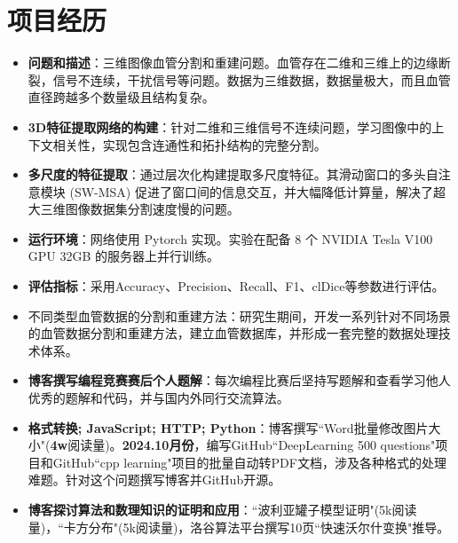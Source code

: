 \documentclass{resume}
\begin{document}

\section{项目经历}

\begin{itemize}	
	\item \textbf{问题和描述}：三维图像血管分割和重建问题。血管存在二维和三维上的边缘断裂，信号不连续，干扰信号等问题。数据为三维数据，数据量极大，而且血管直径跨越多个数量级且结构复杂。
	\item \textbf{3D特征提取网络的构建}：针对二维和三维信号不连续问题，学习图像中的上下文相关性，实现包含连通性和拓扑结构的完整分割。
	\item \textbf{多尺度的特征提取}：通过层次化构建提取多尺度特征。其滑动窗口的多头自注意模块 (SW-MSA) 促进了窗口间的信息交互，并大幅降低计算量，解决了超大三维图像数据集分割速度慢的问题。
	\item \textbf{运行环境}：网络使用 Pytorch 实现。实验在配备 8 个 NVIDIA Tesla V100 GPU 32GB 的服务器上并行训练。
	\item \textbf{评估指标}：采用Accuracy、Precision、Recall、F1、clDice等参数进行评估。
	\item {不同类型血管数据的分割和重建方法}：研究生期间，开发一系列针对不同场景的血管数据分割和重建方法，建立血管数据库，并形成一套完整的数据处理技术体系。
\end{itemize}

\begin{itemize}
  \item \textbf{博客撰写编程竞赛赛后个人题解}：每次编程比赛后坚持写题解和查看学习他人优秀的题解和代码，并与国内外同行交流算法。
  \item \textbf{格式转换; JavaScript; HTTP; Python}：博客撰写``Word批量修改图片大小"(\textbf{4w}阅读量)。\textbf{2024.10月份}，编写GitHub``DeepLearning 500 questions"项目和GitHub``cpp learning"项目的批量自动转PDF文档，涉及各种格式的处理难题。针对这个问题撰写博客并GitHub开源。
  \item \textbf{博客探讨算法和数理知识的证明和应用}：``波利亚罐子模型证明"(5k阅读量)，``卡方分布"(5k阅读量)，洛谷算法平台撰写10页``快速沃尔什变换"推导。
\end{itemize}
\end{document}
